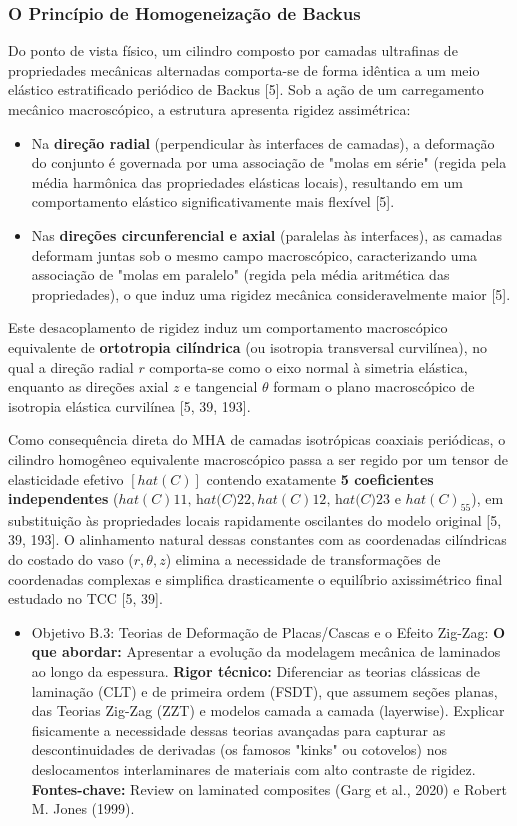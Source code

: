 \subsubsection{O Princípio de Homogeneização de Backus}
Do ponto de vista físico, um cilindro composto por camadas ultrafinas de propriedades mecânicas alternadas comporta-se de forma idêntica a um meio elástico estratificado periódico de Backus [5]. Sob a ação de um carregamento mecânico macroscópico, a estrutura apresenta rigidez assimétrica:
\begin{itemize}
  \item Na \textbf{direção radial} (perpendicular às interfaces de camadas), a deformação do conjunto é governada por uma associação de "molas em série" (regida pela média harmônica das propriedades elásticas locais), resultando em um comportamento elástico significativamente mais flexível [5].
  \item Nas \textbf{direções circunferencial e axial} (paralelas às interfaces), as camadas deformam juntas sob o mesmo campo macroscópico, caracterizando uma associação de "molas em paralelo" (regida pela média aritmética das propriedades), o que induz uma rigidez mecânica consideravelmente maior [5].
\end{itemize}

Este desacoplamento de rigidez induz um comportamento macroscópico equivalente de \textbf{ortotropia cilíndrica} (ou isotropia transversal curvilínea), no qual a direção radial $r$ comporta-se como o eixo normal à simetria elástica, enquanto as direções axial $z$ e tangencial $\theta$ formam o plano macroscópico de isotropia elástica curvilínea [5, 39, 193].

Como consequência direta do MHA de camadas isotrópicas coaxiais periódicas, o cilindro homogêneo equivalente macroscópico passa a ser regido por um tensor de elasticidade efetivo $[hat(C)]$ contendo exatamente \textbf{5 coeficientes independentes} ($hat(C)\textit{{11}, hat(C)}{22}, hat(C)\textit{{12}, hat(C)}{23}$ e $hat(C)_{55}$), em substituição às propriedades locais rapidamente oscilantes do modelo original [5, 39, 193]. O alinhamento natural dessas constantes com as coordenadas cilíndricas do costado do vaso ($r, \theta, z$) elimina a necessidade de transformações de coordenadas complexas e simplifica drasticamente o equilíbrio axissimétrico final estudado no TCC [5, 39].

\begin{itemize}
  \item Objetivo B.3: Teorias de Deformação de Placas/Cascas e o Efeito Zig-Zag:
    \textbf{ O que abordar:} Apresentar a evolução da modelagem mecânica de laminados ao longo da espessura.
    \textbf{ Rigor técnico:} Diferenciar as teorias clássicas de laminação (CLT) e de primeira ordem (FSDT), que assumem seções planas, das Teorias Zig-Zag (ZZT) e modelos camada a camada (layerwise). Explicar fisicamente a necessidade dessas teorias avançadas para capturar as descontinuidades de derivadas (os famosos "kinks" ou cotovelos) nos deslocamentos interlaminares de materiais com alto contraste de rigidez.
    \textbf{ Fontes-chave:} Review on laminated composites (Garg et al., 2020) e Robert M. Jones (1999).
\end{itemize}


